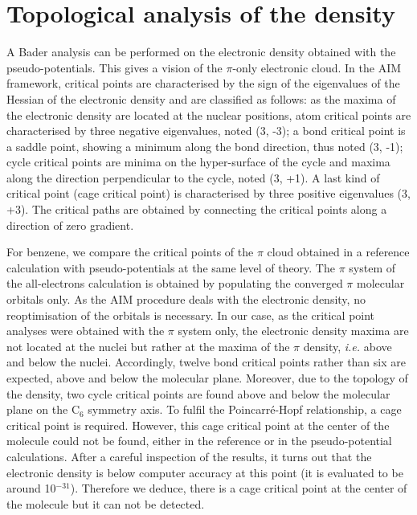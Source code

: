 \documentclass[12pt]{article}
\begin{document}
\section*{\sffamily \large Topological analysis of the density}
A Bader analysis can be performed on the electronic density obtained with the pseudo-potentials.\cite{bader}
This gives a vision of the $\pi$-only electronic cloud.
In the AIM framework, critical points are characterised by the sign of the eigenvalues of the Hessian of 
the electronic density and are classified as follows:
as the maxima of the electronic density are located at the nuclear positions,
atom critical points are characterised by three negative eigenvalues, noted (3, -3);
a bond critical point is a saddle point, showing a minimum along the bond direction,
thus noted (3, -1); cycle critical points are minima on the hyper-surface of the cycle
and maxima along the direction perpendicular to the cycle, noted (3, +1).
A last kind of critical point (cage critical point) is characterised by three positive eigenvalues
(3, +3).
The critical paths are obtained by connecting the critical points along a direction of zero gradient.

For benzene, we compare the critical points of the $\pi$ cloud obtained in a reference calculation
with pseudo-potentials at the same level of theory.
The $\pi$ system of the all-electrons calculation is obtained  by populating the converged $\pi$ molecular orbitals only.
As the AIM procedure deals with the electronic density, no reoptimisation of the orbitals is necessary.
In our case, as the critical point analyses were obtained
with the $\pi$ system only, the electronic density maxima are not
located at the nuclei but rather at the maxima of the $\pi$ density, 
\emph{i.e.} above and below the nuclei. %
Accordingly, twelve bond critical points rather than six are expected,
above and below the molecular plane.
Moreover, due to the topology of the density, two cycle critical points are found above and below the molecular
plane on the C$_6$ symmetry axis.
To fulfil the Poincarré-Hopf relationship, a cage critical point is required. However, this cage critical point 
at the center of the molecule could not be found, either in the reference or in the pseudo-potential 
calculations.
After a careful inspection of the results, it turns out that the electronic density
is below computer accuracy at this point (it is evaluated to be around 10$^{-31}$).
Therefore we deduce, there is a cage critical point at the center of
the molecule but it can not be detected.
\end{document}
